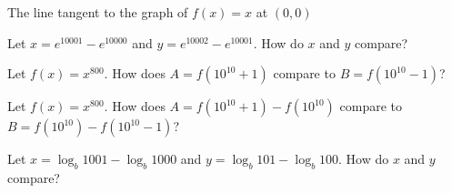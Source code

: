 \documentclass{ximera}
\newcommand{\recommendation}[1]{}
\newcommand{\GoodQuestions}[1]{}
\begin{document}



\begin{problem}
  \recommendation{Vic} \GoodQuestions{Subject: Tangents, velocities,
    and other rates of change 2P}
  
  The line tangent to the graph of $f(x)=x$ at $(0,0)$
  \begin{multipleChoice}
  \end{multipleChoice}
\end{problem}



\begin{problem}
  Let $x = e^{10001} - e^{10000}$ and $y = e^{10002} - e^{10001}$.  How do $x$ and $y$ compare?
  \begin{multipleChoice}
  \end{multipleChoice}
\end{problem}

\begin{problem}
  Let $f(x) = x^{800}$.  How does $A = f(10^{10} + 1)$ compare to $B = f(10^{10} - 1)$?
  \begin{multipleChoice}
  \end{multipleChoice}
\end{problem}

\begin{problem}
  Let $f(x) = x^{800}$.  How does $A = f(10^{10} + 1) - f(10^{10})$ compare to $B = f(10^{10}) - f(10^{10} - 1)$?
  \begin{multipleChoice}
  \end{multipleChoice}
\end{problem}

\begin{problem}
  Let $x = \log_b 1001 - \log_b 1000$ and $y = \log_b 101 - \log_b 100$.  How do $x$ and $y$ compare?
  \begin{multipleChoice}
  \end{multipleChoice}
\end{problem}
\end{document}
